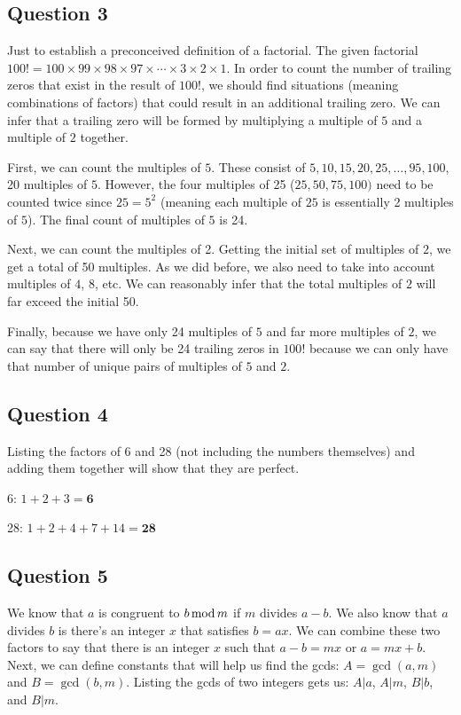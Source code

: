 \documentclass[letterpaper, 12pt]{article}
\begin{document}
\subsection*{Question 3}
Just to establish a preconceived definition of a factorial. The given factorial $100! = 100 \times 99 \times 98 \times 97 \times \cdots \times 3 \times 2 \times 1$. In order to count the number of trailing zeros that exist in the result of $100!$, we should find situations (meaning combinations of factors) that could result in an additional trailing zero. We can infer that a trailing zero will be formed by multiplying a multiple of $5$ and a multiple of $2$ together.

First, we can count the multiples of $5$. These consist of $5, 10, 15, 20, 25,\ldots, 95, 100$, 20 multiples of $5$. However, the four multiples of 25 ($25, 50, 75, 100)$ need to be counted twice since $25=5^2$ (meaning each multiple of $25$ is essentially 2 multiples of $5$). The final count of multiples of $5$ is 24.

Next, we can count the multiples of 2. Getting the initial set of multiples of $2$, we get a total of 50 multiples. As we did before, we also need to take into account multiples of $4$, $8$, etc. We can reasonably infer that the total multiples of $2$ will far exceed the initial 50.

Finally, because we have only 24 multiples of $5$ and far more multiples of $2$, we can say that there will only be 24 trailing zeros in $100!$ because we can only have that number of unique pairs of multiples of $5$ and $2$.

\subsection*{Question 4}
Listing the factors of 6 and 28 (not including the numbers themselves) and adding them together will show that they are perfect.

6: $1+2+3=\textbf{6}$

28: $1+2+4+7+14=\textbf{28}$

\subsection*{Question 5}
We know that $a$ is congruent to $b \mathinner{\text{mod}} m$ if $m$ divides $a-b$. We also know that $a$ divides $b$ is there's an integer $x$ that satisfies $b = ax$. We can combine these two factors to say that there is an integer $x$ such that $a - b = mx$ or $a = mx + b$. Next, we can define constants that will help us find the gcds: $A = \gcd(a, m)$ and $B = \gcd(b,m)$. Listing the gcds of two integers gets us: $A|a$, $A|m$, $B|b$, and $B|m$.
\end{document}

